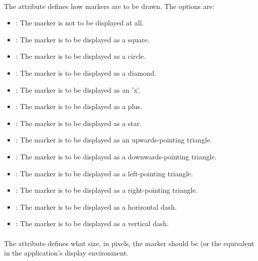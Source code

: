 \begin{blockChanged}
\paragraph*{}

The  attribute defines how markers are to be drawn.  The options are:

\begin{itemize}
        \item \textbf{}: The marker is not to be displayed at all.
        \item \textbf{}: The marker is to be displayed as a square.
        \item \textbf{}: The marker is to be displayed as a circle.
        \item \textbf{}: The marker is to be displayed as a diamond.
        \item \textbf{}: The marker is to be displayed as an 'x'.
        \item \textbf{}: The marker is to be displayed as a plus.
        \item \textbf{}: The marker is to be displayed as a star.
        \item \textbf{}: The marker is to be displayed as an upwards-pointing triangle.
        \item \textbf{}: The marker is to be displayed as a downwards-pointing triangle.
        \item \textbf{}: The marker is to be displayed as a left-pointing triangle.
        \item \textbf{}: The marker is to be displayed as a right-pointing triangle.
        \item \textbf{}: The marker is to be displayed as a horizontal dash.
        \item \textbf{}: The marker is to be displayed as a vertical dash.
\end{itemize}

\paragraph*{}

The  attribute defines what size, in pixels, the marker should be (or the equivalent in the application's display environment.


\end{blockChanged}
